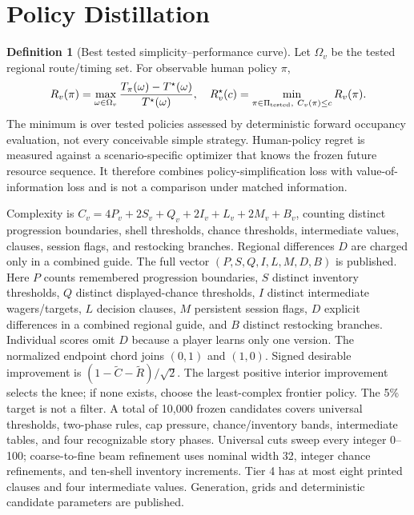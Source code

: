 \documentclass[11pt]{article}
\theoremstyle{definition}\newtheorem{definition}[theorem]{Definition}
\begin{document}
\section{Policy Distillation}
\begin{definition}[Best tested simplicity--performance curve]
Let $\Omega_v$ be the tested regional route/timing set. For observable human policy $\pi$,
\[
 R_v(\pi)=\max_{\omega\in\Omega_v}\frac{T_\pi(\omega)-T^\star(\omega)}{T^\star(\omega)},\quad
 R_v^\star(c)=\min_{\pi\in\Pi_{\rm tested},\ C_v(\pi)\le c} R_v(\pi).
\]
The minimum is over tested policies assessed by deterministic forward occupancy evaluation, not every conceivable simple strategy. Human-policy regret is measured against a scenario-specific optimizer that knows the frozen future resource sequence. It therefore combines policy-simplification loss with value-of-information loss and is not a comparison under matched information.
\end{definition}
Complexity is $C_v=4P_v+2S_v+Q_v+2I_v+L_v+2M_v+B_v$, counting distinct progression boundaries, shell thresholds, chance thresholds, intermediate values, clauses, session flags, and restocking branches. Regional differences $D$ are charged only in a combined guide. The full vector $(P,S,Q,I,L,M,D,B)$ is published. Here $P$ counts remembered progression boundaries, $S$ distinct inventory thresholds, $Q$ distinct displayed-chance thresholds, $I$ distinct intermediate wagers/targets, $L$ decision clauses, $M$ persistent session flags, $D$ explicit differences in a combined regional guide, and $B$ distinct restocking branches. Individual scores omit $D$ because a player learns only one version.
The normalized endpoint chord joins $(0,1)$ and $(1,0)$. Signed desirable improvement is $(1-\widetilde C-\widetilde R)/\sqrt2$. The largest positive interior improvement selects the knee; if none exists, choose the least-complex frontier policy. The 5\% target is not a filter.
A total of 10,000 frozen candidates covers universal thresholds, two-phase rules, cap pressure, chance/inventory bands, intermediate tables, and four recognizable story phases. Universal cuts sweep every integer 0--100; coarse-to-fine beam refinement uses nominal width 32, integer chance refinements, and ten-shell inventory increments. Tier 4 has at most eight printed clauses and four intermediate values. Generation, grids and deterministic candidate parameters are published.
\end{document}
